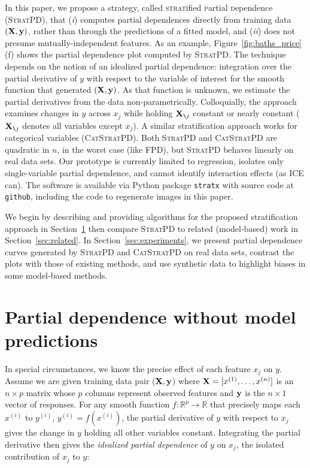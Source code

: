 \documentclass{article}
\newcommand{\secref}[1]{Section~\ref{#1}}
\newcommand{\figref}[1]{Figure~\ref{#1}}
\newcommand{\spd}{\fontfamily{cmr}\textsc{\small StratPD}}
\newcommand{\cspd}{\fontfamily{cmr}\textsc{\small CatStratPD}}
\newcommand{\xnj}{${\bf X}_{\texttt{\char`\\}j}$}
\renewcommand{\xi}{x^{(i)}}
\begin{document}
In this paper, we propose a strategy, called {\textsc{strat}ified \textsc{p}artial \textsc{d}ependence} (\spd{}), that ({\it i}) computes partial dependences directly from training data $({\bf X}, {\bf y})$, rather than through the predictions of a fitted model, and ({\it ii}) does not presume mutually-independent features.  As an example, \figref{fig:baths_price}(f) shows the partial dependence plot computed by \spd. The technique depends on the notion of an idealized partial dependence:  integration over the partial derivative of $y$ with respect to the variable of interest for the smooth function that generated $({\bf X}, {\bf y})$. As that function is unknown, we estimate the partial derivatives from the data non-parametrically.  Colloquially, the approach examines changes in $y$ across $x_j$ while holding \xnj{} constant or nearly constant (\xnj{} denotes all variables except $x_j$). A similar stratification approach works for categorical variables (\cspd). Both \spd{} and \cspd{} are quadratic in $n$, in the worst case (like FPD), but \spd{} behaves linearly on real data sets.  Our prototype is currently limited to regression, isolates only single-variable partial dependence, and cannot identify interaction effects (as ICE can).  The software is available via Python package {\tt stratx} with source code at {\tt github}, including the code to regenerate images in this paper.

We begin by describing and providing algorithms for the proposed stratification approach in \secref{sec:stratpd} then compare \spd{} to related (model-based) work in \secref{sec:related}. In \secref{sec:experiments}, we present partial dependence curves generated by \spd{} and \cspd{} on real data sets, contrast the plots with those of existing methods, and use synthetic data to highlight biases in some model-based methods.

\section{Partial dependence without model predictions}\label{sec:stratpd}

In special circumstances, we know the precise effect of each feature $x_j$ on $y$.  Assume we are given training data pair ($\bf X, y$) where ${\bf X} = [x^{(1)}, \ldots, x^{(n)}]$ is an $n \times p$ matrix whose $p$ columns represent observed features and ${\bf y}$ is the $n \times 1$ vector of responses. For any smooth function $f:\mathbb{R}^{p} \rightarrow \mathbb{R}$ that precisely maps each $\xi$ to $y^{(i)}$, ${y^{(i)}} = f(\xi)$, the partial derivative of $y$ with respect to $x_j$ gives the change in $y$ holding all other variables constant.  Integrating the partial derivative then gives the {\em idealized partial dependence}  of $y$ on $x_j$, the isolated contribution of $x_j$ to $y$:
\end{document}
